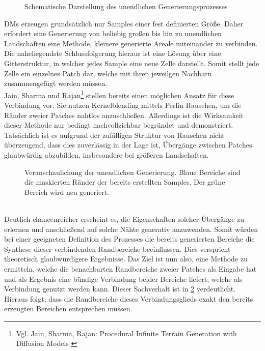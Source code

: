 \begin{figure}[htbp]
    \centering
    \caption{Schematische Darstellung des unendlichen Generierungsprozesses}
    \label{fig:inf_method}
\end{figure}
\ac{DM}s erzeugen grundsätzlich nur Samples einer fest definierten Größe. Daher erfordert eine Generierung von beliebig großen bis hin zu unendlichen Landschaften eine Methode, kleinere generierte Areale miteinander zu verbinden. Die naheliegendste Schlussfolgerung hieraus ist eine Lösung über eine Gitterstruktur, in welcher jedes Sample eine neue Zelle darstellt. Somit stellt jede Zelle ein einzelnes Patch dar, welche mit ihren jeweilgen Nachbarn zusammengefügt werden müssen. \\
Jain, Sharma und Rajan\footnote{
    Vgl. Jain, Sharma, Rajan: Procedural Infinite Terrain Generation with Diffusion Models
    \cite{jain2022adaptive}
} stellen bereits einen möglichen Ansatz für diese Verbindung vor. Sie nutzen Kernelblending mittels Perlin-Rauschen, um die Ränder zweier Patches nahtlos anzuschließen. Allerdings ist die Wirksamkeit dieser Methode nur bedingt nachvollziehbar begründet und demonstriert. Tatsächlich ist es aufgrund der zufälligen Struktur von Rauschen nicht überzeugend, dass dies zuverlässig in der Lage ist, Übergänge zwischen Patches glaubwürdig abzubilden, insbesondere bei größeren Landschaften.
\begin{figure}[htbp]
    \centering
    \caption{Veranschaulichung der unendlichen Generierung. Blaue Bereiche sind die maskierten Ränder der bereits erstellten Samples. Der grüne Bereich wird neu generiert.}
    \label{fig:inf_naive}
\end{figure} \\
Deutlich chancenreicher erscheint es, die Eigenschaften solcher Übergänge zu erlernen und anschließend auf solche Nähte generativ anzuwenden. Somit würden bei einer geeigneten Definition des Prozesses die bereits generierten Bereiche die Synthese dieser verbindenden Randbereiche beeinflussen. Dies verspricht theoretisch glaubwürdigere Ergebnisse. Das Ziel ist nun also, eine Methode zu ermitteln, welche die benachbarten Randbereiche zweier Patches als Eingabe hat und als Ergebnis eine bündige Verbindung beider Bereiche liefert, welche als Verbindung genutzt werden kann. Dieser Sachverhalt ist in \ref{fig:inf_naive} verdeutlicht. Hieraus folgt, dass die Randbereiche dieses Verbindungsglieds exakt den bereits erzeugten Bereichen entsprechen müssen. \\
